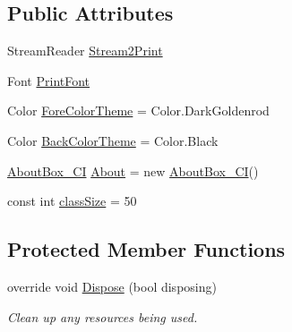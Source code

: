\subsection*{\-Public \-Attributes}
\begin{DoxyCompactItemize}
\item 
\-Stream\-Reader \hyperlink{class_sr_p___classroom_inq_1_1frm_classrrom_inq_aa030f46a7915eae3a0b8b88661be51a8}{\-Stream2\-Print}
\item 
\-Font \hyperlink{class_sr_p___classroom_inq_1_1frm_classrrom_inq_a314e4a61ea8458c5198273335dcf0b5f}{\-Print\-Font}
\item 
\-Color \hyperlink{class_sr_p___classroom_inq_1_1frm_classrrom_inq_ac239384db4489bc4b8b2a4cee9280849}{\-Fore\-Color\-Theme} = \-Color.\-Dark\-Goldenrod
\item 
\-Color \hyperlink{class_sr_p___classroom_inq_1_1frm_classrrom_inq_a29b5dc6ea05e60bb2577a5bef3532d7b}{\-Back\-Color\-Theme} = \-Color.\-Black
\item 
\hyperlink{class_sr_p___classroom_inq_1_1_about_box___c_i}{\-About\-Box\-\_\-\-C\-I} \hyperlink{class_sr_p___classroom_inq_1_1frm_classrrom_inq_aa797137da7c6757a4fc98c07d41928db}{\-About} = new \hyperlink{class_sr_p___classroom_inq_1_1_about_box___c_i}{\-About\-Box\-\_\-\-C\-I}()
\item 
const int \hyperlink{class_sr_p___classroom_inq_1_1frm_classrrom_inq_a78d9aab335edfe53d39036b9d89928a8}{class\-Size} = 50
\end{DoxyCompactItemize}
\subsection*{\-Protected \-Member \-Functions}
\begin{DoxyCompactItemize}
\item 
override void \hyperlink{class_sr_p___classroom_inq_1_1frm_classrrom_inq_a7e6095e2ed04a53088833156d8d205b1}{\-Dispose} (bool disposing)
\begin{DoxyCompactList}\small\item\em \-Clean up any resources being used. \end{DoxyCompactList}\end{DoxyCompactItemize}
